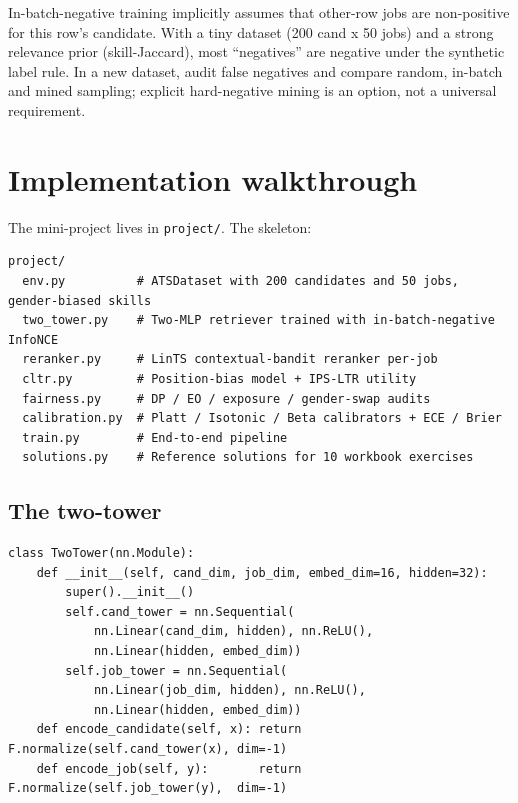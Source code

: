 \documentclass[11pt,oneside]{scrbook}
\begin{document}
\begin{pitfall}
In-batch-negative training implicitly assumes that other-row jobs are
non-positive for this row's candidate. With a tiny dataset (200 cand x 50
jobs) and a strong relevance prior (skill-Jaccard), most ``negatives'' are
negative under the synthetic label rule. In a new dataset, audit
false negatives and compare random, in-batch and mined sampling; explicit
hard-negative mining is an option, not a universal requirement.
\end{pitfall}

\chapter{Implementation walkthrough}

The mini-project lives in \texttt{project/}. The skeleton:

\begin{verbatim}
project/
  env.py          # ATSDataset with 200 candidates and 50 jobs, gender-biased skills
  two_tower.py    # Two-MLP retriever trained with in-batch-negative InfoNCE
  reranker.py     # LinTS contextual-bandit reranker per-job
  cltr.py         # Position-bias model + IPS-LTR utility
  fairness.py     # DP / EO / exposure / gender-swap audits
  calibration.py  # Platt / Isotonic / Beta calibrators + ECE / Brier
  train.py        # End-to-end pipeline
  solutions.py    # Reference solutions for 10 workbook exercises
\end{verbatim}

\section{The two-tower}

\begin{verbatim}
class TwoTower(nn.Module):
    def __init__(self, cand_dim, job_dim, embed_dim=16, hidden=32):
        super().__init__()
        self.cand_tower = nn.Sequential(
            nn.Linear(cand_dim, hidden), nn.ReLU(),
            nn.Linear(hidden, embed_dim))
        self.job_tower = nn.Sequential(
            nn.Linear(job_dim, hidden), nn.ReLU(),
            nn.Linear(hidden, embed_dim))
    def encode_candidate(self, x): return F.normalize(self.cand_tower(x), dim=-1)
    def encode_job(self, y):       return F.normalize(self.job_tower(y),  dim=-1)
\end{verbatim}
\end{document}
